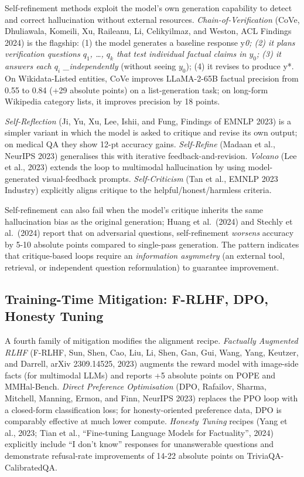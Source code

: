Self-refinement methods exploit the model's own generation capability to detect and correct hallucination without external resources. \emph{Chain-of-Verification} (CoVe, Dhuliawala, Komeili, Xu, Raileanu, Li, Celikyilmaz, and Weston, ACL Findings 2024) is the flagship: (1) the model generates a baseline response y\emph{0; (2) it plans verification questions \(q_1\), \ldots, \(q_k\) that test individual factual claims in \(y_0\); (3) it answers each \(q_i\) \_independently} (without seeing \(y_0\)); (4) it revises to produce y*. On Wikidata-Listed entities, CoVe improves LLaMA-2-65B factual precision from 0.55 to 0.84 (+29 absolute points) on a list-generation task; on long-form Wikipedia category lists, it improves precision by 18 points.

\emph{Self-Reflection} (Ji, Yu, Xu, Lee, Ishii, and Fung, Findings of EMNLP 2023) is a simpler variant in which the model is asked to critique and revise its own output; on medical QA they show 12-pt accuracy gains. \emph{Self-Refine} (Madaan et al., NeurIPS 2023) generalises this with iterative feedback-and-revision. \emph{Volcano} (Lee et al., 2023) extends the loop to multimodal hallucination by using model-generated visual-feedback prompts. \emph{Self-Criticism} (Tan et al., EMNLP 2023 Industry) explicitly aligns critique to the helpful/honest/harmless criteria.

Self-refinement can also fail when the model's critique inherits the same hallucination bias as the original generation; Huang et al.~(2024) and Stechly et al.~(2024) report that on adversarial questions, self-refinement \emph{worsens} accuracy by 5-10 absolute points compared to single-pass generation. The pattern indicates that critique-based loops require an \emph{information asymmetry} (an external tool, retrieval, or independent question reformulation) to guarantee improvement.

\subsection{Training-Time Mitigation: F-RLHF, DPO, Honesty Tuning}\label{training-time-mitigation-f-rlhf-dpo-honesty-tuning}

A fourth family of mitigation modifies the alignment recipe. \emph{Factually Augmented RLHF} (F-RLHF, Sun, Shen, Cao, Liu, Li, Shen, Gan, Gui, Wang, Yang, Keutzer, and Darrell, arXiv 2309.14525, 2023) augments the reward model with image-side facts (for multimodal LLMs) and reports +5 absolute points on POPE and MMHal-Bench. \emph{Direct Preference Optimisation} (DPO, Rafailov, Sharma, Mitchell, Manning, Ermon, and Finn, NeurIPS 2023) replaces the PPO loop with a closed-form classification loss; for honesty-oriented preference data, DPO is comparably effective at much lower compute. \emph{Honesty Tuning} recipes (Yang et al., 2023; Tian et al., ``Fine-tuning Language Models for Factuality'', 2024) explicitly include ``I don't know'' responses for unanswerable questions and demonstrate refusal-rate improvements of 14-22 absolute points on TriviaQA-CalibratedQA.

